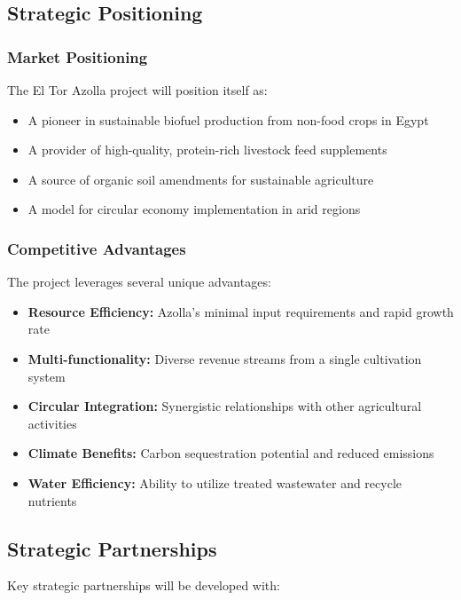 \subsection{Strategic Positioning}

\subsubsection{Market Positioning}
The El Tor Azolla project will position itself as:

\begin{itemize}
    \item A pioneer in sustainable biofuel production from non-food crops in Egypt
    \item A provider of high-quality, protein-rich livestock feed supplements
    \item A source of organic soil amendments for sustainable agriculture
    \item A model for circular economy implementation in arid regions
\end{itemize}

\subsubsection{Competitive Advantages}
The project leverages several unique advantages:

\begin{itemize}
    \item \textbf{Resource Efficiency:} Azolla's minimal input requirements and rapid growth rate
    \item \textbf{Multi-functionality:} Diverse revenue streams from a single cultivation system
    \item \textbf{Circular Integration:} Synergistic relationships with other agricultural activities
    \item \textbf{Climate Benefits:} Carbon sequestration potential and reduced emissions
    \item \textbf{Water Efficiency:} Ability to utilize treated wastewater and recycle nutrients
\end{itemize}

\subsection{Strategic Partnerships}

Key strategic partnerships will be developed with:

